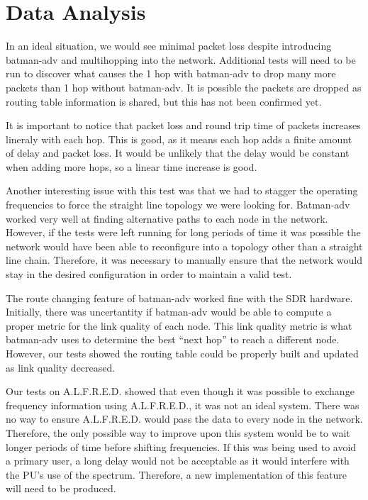 
\section{Data Analysis}

In an ideal situation, we would see minimal packet loss despite introducing batman-adv and multihopping into the network. Additional tests will need to be run to discover what causes the 1 hop with batman-adv to drop many more packets than 1 hop without batman-adv. It is possible the packets are dropped as routing table information is shared, but this has not been confirmed yet. 

It is important to notice that packet loss and round trip time of packets increases lineraly with each hop. This is good, as it means each hop adds a finite amount of delay and packet loss. It would be unlikely that the delay would be constant when adding more hops, so a linear time increase is good. 

Another interesting issue with this test was that we had to stagger the operating frequencies to force the straight line topology we were looking for. Batman-adv worked very well at finding alternative paths to each node in the network. However, if the tests were left running for long periods of time it was possible the network would have been able to reconfigure into a topology other than a straight line chain. Therefore, it was necessary to manually ensure that the network would stay in the desired configuration in order to maintain a valid test. 

The route changing feature of batman-adv worked fine with the SDR hardware. Initially, there was uncertantity if batman-adv would be able to compute a proper metric for the link quality of each node. This link quality metric is what batman-adv uses to determine the best ``next hop'' to reach a different node. However, our tests showed the routing table could be properly built and updated as link quality decreased.

Our tests on A.L.F.R.E.D. showed that even though it was possible to exchange frequency information using A.L.F.R.E.D., it was not an ideal system. There was no way to ensure A.L.F.R.E.D. would pass the data to every node in the network. Therefore, the only possible way to improve upon this system would be to wait longer periods of time before shifting frequencies. If this was being used to avoid a primary user, a long delay would not be acceptable as it would interfere with the PU's use of the spectrum. Therefore, a new implementation of this feature will need to be produced. 



